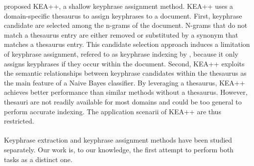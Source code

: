      proposed KEA++, a %
    shallow keyphrase assignment method.
    KEA++ uses a domain-specific thesaurus to assign keyphrases to a document. First, keyphrase candidate are selected among the n-grams of the document.
    N-grams that do not match a thesaurus entry are either removed or substituted by a synonym that matches a thesaurus entry. This candidate selection approach induces a limitation of keyphrase assignment, refered to as keyphrase indexing by , because it only assigns keyphrases if they occur within the document.
    Second, KEA++
    exploits the semantic relationships between keyphrase candidates within the thesaurus as the main feature of a Naive Bayes classifier.
    By leveraging a thesaurus, KEA++ achieves better performance than similar methods without a thesaurus.
    However, thesauri are not readily available for most domains and could be too general to perform accurate indexing.
    The application scenarii of KEA++ are thus restricted.

    
    
    \paragraph{}
    Keyphrase extraction and keyphrase assignment methods have been studied separately.
    Our work is, to our knowledge, the first attempt to perform both tasks as a distinct one.
    
    
    

